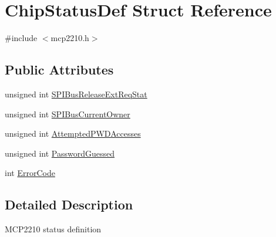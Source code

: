 \hypertarget{struct_chip_status_def}{\section{\-Chip\-Status\-Def \-Struct \-Reference}
\label{struct_chip_status_def}
}


{\ttfamily \#include $<$mcp2210.\-h$>$}

\subsection*{\-Public \-Attributes}
\begin{DoxyCompactItemize}
\item 
unsigned int \hyperlink{struct_chip_status_def_ac1422f04b7345187a77b5d506dc8a492}{\-S\-P\-I\-Bus\-Release\-Ext\-Req\-Stat}
\item 
unsigned int \hyperlink{struct_chip_status_def_ac8d8808a7cf921e77831dc4e30e8d096}{\-S\-P\-I\-Bus\-Current\-Owner}
\item 
unsigned int \hyperlink{struct_chip_status_def_a775f8cb07137f324ce59e7bbc961fd55}{\-Attempted\-P\-W\-D\-Accesses}
\item 
unsigned int \hyperlink{struct_chip_status_def_ae83bf4d444de30c1a451f9aef7ce4d6f}{\-Password\-Guessed}
\item 
int \hyperlink{struct_chip_status_def_ab359484a0244ec153c49f0af23c2d29b}{\-Error\-Code}
\end{DoxyCompactItemize}


\subsection{\-Detailed \-Description}
\-M\-C\-P2210 status definition 

